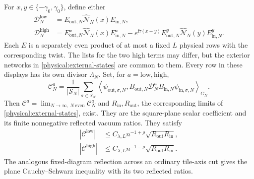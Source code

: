 \begin{theorem}
For \(x,y\in\{-\gamma_0,\gamma_0\}\), define either
\begin{align}
 \mathcal D_N^{\mathrm{low}}
 &=E_{\mathrm{out},N}\widehat{\mathcal N}_N(x)E_{\mathrm{in},N},
 \label{physical:physical-low-operator}\\
 \mathcal D_N^{\mathrm{high}}
 &=E^x_{\mathrm{out},N}\widehat{\mathcal N}_N(x)E^x_{\mathrm{in},N}
 -e^{\ii\tau(x-y)}E^y_{\mathrm{out},N}\widehat{\mathcal N}_N(y)
       E^y_{\mathrm{in},N}.
 \label{physical:physical-high-operator}
\end{align}
Each \(E\) is a separately even product of at most a fixed \(L\) physical
rows with the corresponding twist.  The lists for the two high terms may
differ, but the exterior networks in \eqref{physical:external-states}
are common to them.  Every row in these displays has its own divisor
\(\Lambda_N\).  Set, for \(a=\mathrm{low},\mathrm{high}\),
\begin{equation}\label{physical:averaged-scalar}
 \mathcal C_N^a=\frac1{|\mathcal S_N|}\sum_{\sigma\in\mathcal S_N}
 \left\langle\psi_{\mathrm{out},\sigma,N},
 B_{\mathrm{out},N}\mathcal D_N^a B_{\mathrm{in},N}
 \psi_{\mathrm{in},\sigma,N}\right\rangle_{G_N}.
\end{equation}
Then \(\mathcal C^a=\lim_{N\to\infty,\ N\ \mathrm{even}}\mathcal C_N^a\)
and \(R_{\mathrm{in}},R_{\mathrm{out}}\), the corresponding limits of
\eqref{physical:external-states}, exist.  They are the square-plane
scalar coefficient and its finite nonnegative reflected vacuum ratios.
They satisfy
\begin{align}
 |\mathcal C^{\mathrm{low}}|
 &\le C_{\lambda,L}n^{-1+\rho}
       \sqrt{R_{\mathrm{out}}R_{\mathrm{in}}},
 \label{physical:scalar-low}\\
 |\mathcal C^{\mathrm{high}}|
 &\le C_{\lambda,L}n^{-1-\rho}
       \sqrt{R_{\mathrm{out}}R_{\mathrm{in}}}.
 \label{physical:scalar-high}
\end{align}
The analogous fixed-diagram reflection across an ordinary tile-axis cut
gives the plane Cauchy--Schwarz inequality with its two reflected ratios.
\end{theorem}


